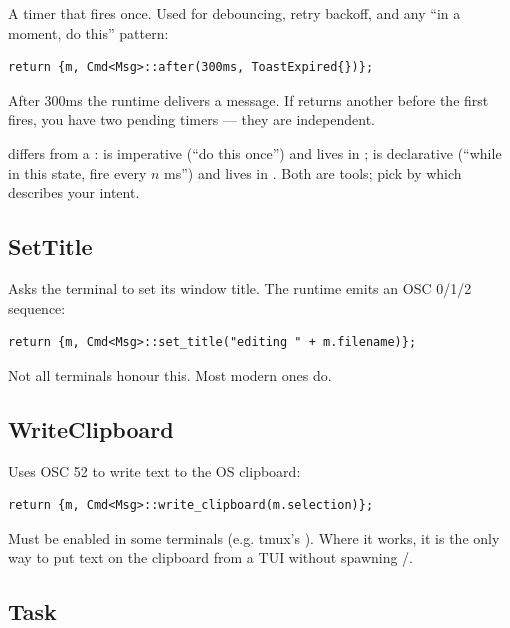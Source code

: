 A timer that fires once. Used for debouncing, retry backoff, and
any ``in a moment, do this'' pattern:

\begin{lstlisting}
return {m, Cmd<Msg>::after(300ms, ToastExpired{})};
\end{lstlisting}

After 300ms the runtime delivers a  message.
If  returns another  before the first
fires, you have two pending timers --- they are independent.

\begin{aside}
 differs from a :  is
imperative (``do this once'') and lives in ; 
is declarative (``while in this state, fire every $n$ ms'') and
lives in . Both are tools; pick by which describes your
intent.
\end{aside}

\subsection*{SetTitle}

Asks the terminal to set its window title. The runtime emits an
OSC 0/1/2 sequence:

\begin{lstlisting}
return {m, Cmd<Msg>::set_title("editing " + m.filename)};
\end{lstlisting}

Not all terminals honour this. Most modern ones do.

\subsection*{WriteClipboard}

Uses OSC 52 to write text to the OS clipboard:

\begin{lstlisting}
return {m, Cmd<Msg>::write_clipboard(m.selection)};
\end{lstlisting}

Must be enabled in some terminals (e.g. tmux's
). Where it works, it is the only way to
put text on the clipboard from a TUI without spawning
/.

\subsection*{Task}

